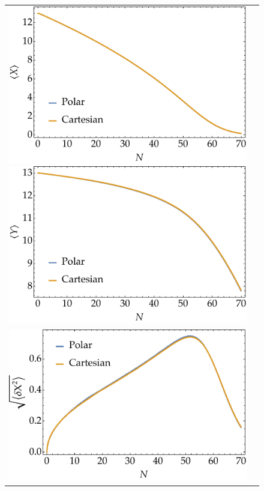 \documentclass[aps, prd
, preprint
, nofootinbib 
]{revtex4-1}
\begin{document}
\begin{figure}
	\centering
	\begin{tabular}{cc}
		\begin{minipage}{0.5\hsize}
			\centering
			\includegraphics[width=\hsize]{figs/meanX.pdf}
		\end{minipage}
		\begin{minipage}{0.5\hsize}
			\centering
			\includegraphics[width=\hsize]{figs/meanY.pdf}
		\end{minipage} \\
		\begin{minipage}{0.5\hsize}
			\centering
			\includegraphics[width=\hsize]{figs/stdX.pdf}

\end{minipage}
\end{tabular}
\end{figure}
\end{document}

